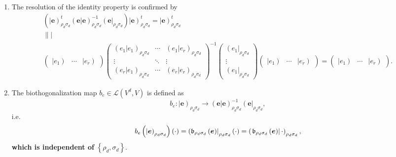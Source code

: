 \documentclass[aps,preprint]{revtex4}
\begin{document}
\begin{enumerate}
\item The resolution of the identity property is confirmed by 
\begin{gather}
\left( \overset{}{\left\vert \boldsymbol{e}\right) _{\rho _{d}\sigma
_{d}}^{t}\left( \left. \boldsymbol{e}\right\vert \boldsymbol{e}\right)
_{\rho _{d}\sigma _{d}}^{-1}\left( \boldsymbol{e}\right\vert _{\rho
_{d}\sigma _{d}}}\right) \left\vert \boldsymbol{e}\right) _{\rho _{d}\sigma
_{d}}^{t}=\left\vert \boldsymbol{e}\right) _{\rho _{d}\sigma _{d}}^{t} \\
\parallel \mid \\
\left( 
\begin{array}{ccc}
\left\vert e_{1}\right) & \cdots & \left\vert e_{r}\right)%
\end{array}%
\right) \left( 
\begin{array}{ccc}
\left( \left. e_{1}\right\vert e_{1}\right) _{\rho _{d}\sigma _{d}} & \cdots
& \left( \left. e_{1}\right\vert e_{r}\right) _{\rho _{d}\sigma _{d}} \\ 
\vdots & \ddots & \vdots \\ 
\left( \left. e_{r}\right\vert e_{1}\right) _{\rho _{d}\sigma _{d}} & \cdots
& \left( \left. e_{r}\right\vert e_{r}\right) _{\rho _{d}\sigma _{d}}%
\end{array}%
\right) ^{\boldsymbol{-}1}\left( 
\begin{array}{c}
\left( e_{1}\right\vert _{\rho _{d}\sigma _{d}} \\ 
\vdots \\ 
\left( e_{1}\right\vert _{\rho _{d}\sigma _{d}}%
\end{array}%
\right) \left( 
\begin{array}{ccc}
\left\vert e_{1}\right) & \cdots & \left\vert e_{r}\right)%
\end{array}%
\right) =\left( 
\begin{array}{ccc}
\left\vert e_{1}\right) & \cdots & \left\vert e_{r}\right)%
\end{array}%
\right) .
\end{gather}

\item The biothogonalization map $b_{e}\in \mathcal{L}\left( V^{d},V\right) $
is defined as 
\begin{equation}
b_{e}:\left\vert \boldsymbol{e}\right) _{\rho _{d}\sigma _{d}}\rightarrow
\left( \left. \boldsymbol{e}\right\vert \boldsymbol{e}\right) _{\rho
_{d}\sigma _{d}}^{-1}\left( \boldsymbol{e}\right\vert _{\rho _{d}\sigma
_{d}},
\end{equation}%
i.e. 
\begin{equation}
b_{e}\left( \left\vert \boldsymbol{e}\right) _{\rho _{d}\sigma _{d}}\right)
\left( \cdot \right) =\left( \mathfrak{b}_{\rho _{d}\sigma _{d}}\left( 
\boldsymbol{e}\right) \right\vert _{\rho _{d}\sigma _{d}}\left( \cdot
\right) =\left( \left. \mathfrak{b}_{\rho _{d}\sigma _{d}}\left( \boldsymbol{%
e}\right) \right\vert \cdot \right) _{\rho _{d}\sigma _{d}},
\end{equation}%
\textbf{which is independent of} $\left\{ \rho _{d},\sigma _{d}\right\} .$


\end{enumerate}
\end{document}
